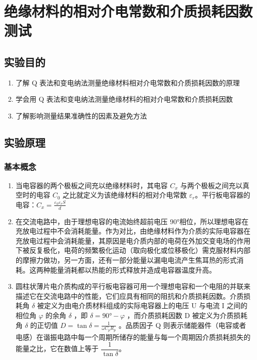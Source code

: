 \chapter{绝缘材料的相对介电常数和介质损耗因数测试}
\section{实验目的}
    \begin{enumerate}
        \item 了解 Q 表法和变电纳法测量绝缘材料相对介电常数和介质损耗因数的原理
        \item 学会用 Q 表法和变电纳法测量绝缘材料的相对介电常数和介质损耗因数
        \item 了解影响测量结果准确性的因素及避免方法
    \end{enumerate}
\section{实验原理}%
    \subsection{基本概念}
        \begin{enumerate}
            \item 当电容器的两个极板之间充以绝缘材料时，其电容 $C_x$ 与两个极板之间充以真空时的电容 $C_0$ 之比就定义为该绝缘材料的相对介电常数 $\varepsilon_r$。平行板电容器的电容：$C_x=\frac{\varepsilon_0 \varepsilon_r S}{d}$
            \item 在交流电路中，由于理想电容的电流始终超前电压 90°相位，所以理想电容在充放电过程中不会消耗能量。作为对比，由绝缘材料作为介质的实际电容器在充放电过程中会消耗能量，其原因是电介质内部的电荷在外加交变电场的作用下被反复极化，电荷的频繁极化运动（取向极化或位移极化）需克服材料内部的摩擦力做功，另一方面，还有一部分能量以漏电电流产生焦耳热的形式消耗。这两种能量消耗都以热能的形式释放并造成电容器温度升高。
            \item 圆柱状薄片电介质构成的平行板电容器可用一个理想电容和一个电阻的并联来描述它在交流电路中的性能，它们应具有相同的阻抗和介质损耗因数。介质损耗角 $\delta$ 被定义为由电介质材料组成的实际电容器上的电压 U 与电流 I 之间的相位角 $\varphi$ 的余角 $\delta$ ，即 $\delta  = 90\si{\degree} - \varphi$ ，而介质损耗因数 D 被定义为介质损耗角 $\delta$ 的正切值 $D=\tan\delta=\frac{1}{\omega C_{p}R_{p}}$ 。品质因子 Q 则表示储能器件（电容或者电感）在谐振电路中每一个周期所储存的能量与每一个周期因介质损耗损失的能量之比，它在数值上等于 $\dfrac{1}{\tan\delta}$。
        \end{enumerate}
        
